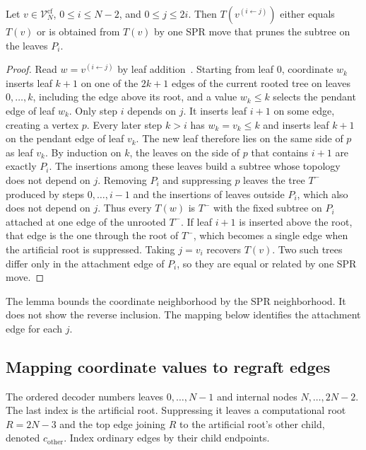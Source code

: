 \begin{lemma}
\label{lem:coord_spr}
Let $v\in\mathcal V_N^{\mathrm{cf}}$, $0\leq i\leq N-2$, and $0\leq j\leq2i$.
Then $T(v^{(i\leftarrow j)})$ either equals $T(v)$ or is obtained from $T(v)$ by one SPR move that prunes the subtree on the leaves $P_i$.
\end{lemma}
\begin{proof}
Read $w=v^{(i\leftarrow j)}$ by leaf addition~\cite{penn2024phylo2vec}.
Starting from leaf $0$, coordinate $w_k$ inserts leaf $k+1$ on one of the $2k+1$ edges of the current rooted tree on leaves $0,\ldots,k$, including the edge above its root, and a value $w_k\leq k$ selects the pendant edge of leaf $w_k$.
Only step $i$ depends on $j$.
It inserts leaf $i+1$ on some edge, creating a vertex $p$.
Every later step $k>i$ has $w_k=v_k\leq k$ and inserts leaf $k+1$ on the pendant edge of leaf $v_k$.
The new leaf therefore lies on the same side of $p$ as leaf $v_k$.
By induction on $k$, the leaves on the side of $p$ that contains $i+1$ are exactly $P_i$.
The insertions among these leaves build a subtree whose topology does not depend on $j$.
Removing $P_i$ and suppressing $p$ leaves the tree $T^-$ produced by steps $0,\ldots,i-1$ and the insertions of leaves outside $P_i$, which also does not depend on $j$.
Thus every $T(w)$ is $T^-$ with the fixed subtree on $P_i$ attached at one edge of the unrooted $T^-$.
If leaf $i+1$ is inserted above the root, that edge is the one through the root of $T^-$, which becomes a single edge when the artificial root is suppressed.
Taking $j=v_i$ recovers $T(v)$.
Two such trees differ only in the attachment edge of $P_i$, so they are equal or related by one SPR move.
\end{proof}

The lemma bounds the coordinate neighborhood by the SPR neighborhood.
It does not show the reverse inclusion.
The mapping below identifies the attachment edge for each $j$.

\subsection{Mapping coordinate values to regraft edges}
\label{sec:mapping}

The ordered decoder numbers leaves $0,\ldots,N-1$ and internal nodes $N,\ldots,2N-2$.
The last index is the artificial root.
Suppressing it leaves a computational root $R=2N-3$ and the top edge joining $R$ to the artificial root's other child, denoted $c_{\mathrm{other}}$.
Index ordinary edges by their child endpoints.

